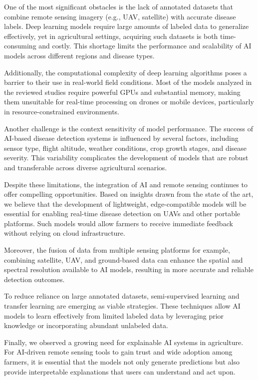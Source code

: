 One of the most significant obstacles is the lack of annotated datasets that combine remote sensing imagery (e.g., UAV, satellite) with accurate disease labels. Deep learning models require large amounts of labeled data to generalize effectively, yet in agricultural settings, acquiring such datasets is both time-consuming and costly. This shortage limits the performance and scalability of AI models across different regions and disease types.

Additionally, the computational complexity of deep learning algorithms poses a barrier to their use in real-world field conditions. Most of the models analyzed in the reviewed studies require powerful GPUs and substantial memory, making them unsuitable for real-time processing on drones or mobile devices, particularly in resource-constrained environments.

Another challenge is the context sensitivity of model performance. The success of AI-based disease detection systems is influenced by several factors, including sensor type, flight altitude, weather conditions, crop growth stages, and disease severity. This variability complicates the development of models that are robust and transferable across diverse agricultural scenarios.

Despite these limitations, the integration of AI and remote sensing continues to offer compelling opportunities. Based on insights drawn from the state of the art, we believe that the development of lightweight, edge-compatible models will be essential for enabling real-time disease detection on UAVs and other portable platforms. Such models would allow farmers to receive immediate feedback without relying on cloud infrastructure.

Moreover, the fusion of data from multiple sensing platforms for example, combining satellite, UAV, and ground-based data can enhance the spatial and spectral resolution available to AI models, resulting in more accurate and reliable detection outcomes.

To reduce reliance on large annotated datasets, semi-supervised learning and transfer learning are emerging as viable strategies. These techniques allow AI models to learn effectively from limited labeled data by leveraging prior knowledge or incorporating abundant unlabeled data.

Finally, we observed a growing need for explainable AI systems in agriculture. For AI-driven remote sensing tools to gain trust and wide adoption among farmers, it is essential that the models not only generate predictions but also provide interpretable explanations that users can understand and act upon.

